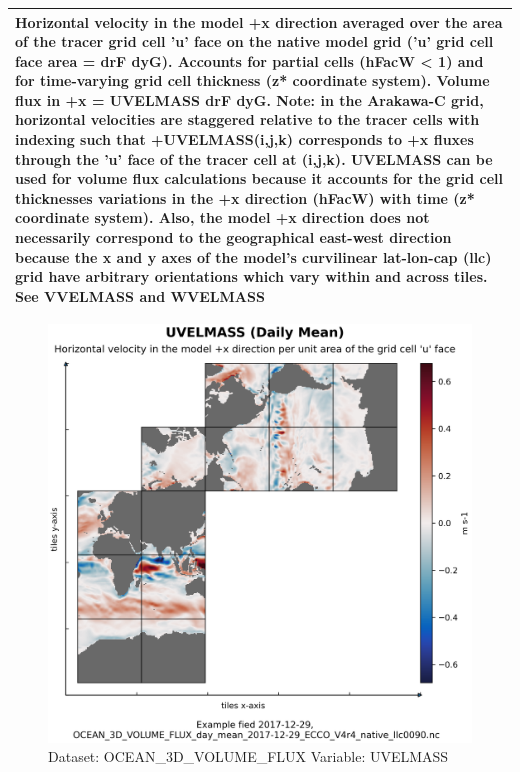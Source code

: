\begin{longtable}{|m{}|m{}|m{}|m{}|}
\multicolumn{4}{|p{1\textwidth}|}{Horizontal velocity in the model +x direction averaged over the area of the tracer grid cell 'u' face on the native model grid ('u' grid cell face area = drF dyG). Accounts for partial cells (hFacW < 1) and for time-varying grid cell thickness (z* coordinate system). Volume flux in +x = UVELMASS drF dyG. Note: in the Arakawa-C grid, horizontal velocities are staggered relative to the tracer cells with indexing such that +UVELMASS(i,j,k) corresponds to +x fluxes through the 'u' face of the tracer cell at (i,j,k). UVELMASS can be used for volume flux calculations because it accounts for the grid cell thicknesses variations in the +x direction (hFacW) with time (z* coordinate system). Also, the model +x direction does not necessarily correspond to the geographical east-west direction because the x and y axes of the model's curvilinear lat-lon-cap (llc) grid have arbitrary orientations which vary within and across tiles. See VVELMASS and WVELMASS} \\ \hline
\end{longtable}

\begin{figure}[H]
\centering
\includegraphics[scale=0.55]{../images/plots/native_plots/Ocean_Three-Dimensional_Volume_Fluxes/UVELMASS.png}
\caption{Dataset: OCEAN\_3D\_VOLUME\_FLUX Variable: UVELMASS}
\label{tab:table-OCEAN_3D_VOLUME_FLUX_UVELMASS-Plot}
\end{figure}
\pagebreak
